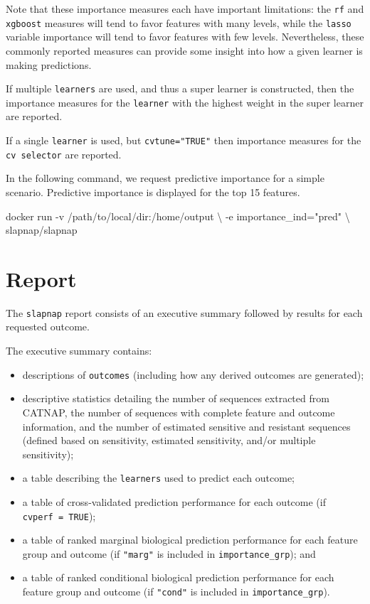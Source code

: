 \documentclass[]{article}
\newenvironment{Shaded}{\begin{snugshade}}{\end{snugshade}}
\newcommand{\StringTok}[1]{\textcolor[rgb]{0.31,0.60,0.02}{#1}}
\newcommand{\ExtensionTok}[1]{#1}
\newcommand{\NormalTok}[1]{#1}
\providecommand{\tightlist}{%
  \setlength{\itemsep}{0pt}\setlength{\parskip}{0pt}}
\begin{document}
Note that these importance measures each have important limitations: the
\texttt{rf} and \texttt{xgboost} measures will tend to favor features
with many levels, while the \texttt{lasso} variable importance will tend
to favor features with few levels. Nevertheless, these commonly reported
measures can provide some insight into how a given learner is making
predictions.

If multiple \texttt{learners} are used, and thus a super learner is
constructed, then the importance measures for the \texttt{learner} with
the highest weight in the super learner are reported.

If a single \texttt{learner} is used, but \texttt{cvtune="TRUE"} then
importance measures for the \texttt{cv\ selector} are reported.

In the following command, we request predictive importance for a simple
scenario. Predictive importance is displayed for the top 15 features.

\begin{Shaded}
\begin{Highlighting}[]
\ExtensionTok{docker}\NormalTok{ run -v /path/to/local/dir:/home/output \textbackslash{}}
\NormalTok{           -e importance_ind=}\StringTok{"pred"}\NormalTok{ \textbackslash{}}
\NormalTok{           slapnap/slapnap}
\end{Highlighting}
\end{Shaded}

\section{Report}\label{sec:report}

The \texttt{slapnap} report consists of an executive summary followed by
results for each requested outcome.

The executive summary contains:

\begin{itemize}
\tightlist
\item
  descriptions of \texttt{outcomes} (including how any derived outcomes
  are generated);
\item
  descriptive statistics detailing the number of sequences extracted
  from CATNAP, the number of sequences with complete feature and outcome
  information, and the number of estimated sensitive and resistant
  sequences (defined based on sensitivity, estimated sensitivity, and/or
  multiple sensitivity);
\item
  a table describing the \texttt{learners} used to predict each outcome;
\item
  a table of cross-validated prediction performance for each outcome (if
  \texttt{cvperf\ =\ TRUE});
\item
  a table of ranked marginal biological prediction performance for each
  feature group and outcome (if \texttt{"marg"} is included in
  \texttt{importance\_grp}); and
\item
  a table of ranked conditional biological prediction performance for
  each feature group and outcome (if \texttt{"cond"} is included in
  \texttt{importance\_grp}).
\end{itemize}
\end{document}

